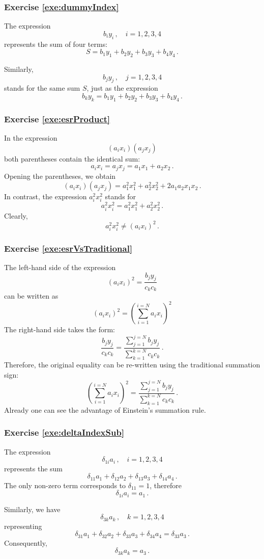 \subsubsection*{Exercise \ref{exe:dummyIndex}}
The expression
\[
b_iy_i\,,\quad i = 1,2,3,4
\]
represents the sum of four terms:
\[
S = b_1y_1 + b_2y_2 + b_3y_3 + b_4y_4\,.
\]

Similarly,
\[
b_jy_j\,,\quad j = 1,2,3,4
\]
stands for the same sum $S$, just as the expression
\[
b_ky_k = b_1y_1 + b_2y_2 + b_3y_3 + b_4y_4\,.
\]

\subsubsection*{Exercise \ref{exe:esrProduct}}
In the expression
\[
(a_ix_i)(a_jx_j)
\]
both parentheses contain the identical sum:
\[
a_ix_i = a_jx_j = a_1x_1 + a_2x_2\,.
\]
Opening the parentheses, we obtain
\[
(a_ix_i)(a_jx_j) = a^2_1x^2_1 + a^2_2x^2_2 + 2a_1a_2x_1x_2\,.
\]
In contrast, the expression $a_i^2x_i^2$ stands for
\[
a_i^2x_i^2 = a^2_1x^2_1 + a^2_2x^2_2\,.
\]
Clearly,
\[
a_i^2x_i^2 \ne (a_ix_i)^2\,.
\]

\subsubsection*{Exercise \ref{exe:esrVsTraditional}}
The left-hand side of the expression
\[
(a_i x_i)^2 = \frac{b_j y_j}{c_k c_k}
\]
can be written as
\[
(a_i x_i)^2 = \left(\sum\limits_{i=1}^{i=N}a_ix_i\right)^2
\]
The right-hand side takes the form:
\[
\frac{b_j y_j}{c_k c_k} = \frac{\sum\limits_{j=1}^{j=N} b_j
  y_j}{\sum\limits_{k=1}^{k=N} c_k c_k}\,.
\]
Therefore, the original equality can be re-written using the
traditional summation sign:
\[
\left(\sum\limits_{i=1}^{i=N}a_ix_i\right)^2 = \frac{\sum\limits_{j=1}^{j=N} b_j
  y_j}{\sum\limits_{k=1}^{k=N} c_k c_k}\,.
\]
Already one can see the advantage of Einstein's summation rule.


\subsubsection*{Exercise \ref{exe:deltaIndexSub}}
The expression
\[
\delta_{1i}a_i\,,\quad i = 1,2,3,4
\]
represents the sum
\[
\delta_{11}a_1 + \delta_{12}a_2 + \delta_{13}a_3 + \delta_{14}a_4\,.
\]
The only non-zero term corresponds to $\delta_{11} = 1$, therefore
\[
\delta_{1i}a_i = a_1\,.
\]

Similarly, we have
\[
\delta_{3k}a_k\,,\quad k = 1,2,3,4
\]
representing
\[
\delta_{31}a_1 + \delta_{32}a_2 + \delta_{33}a_3 + \delta_{34}a_4 = \delta_{33}a_3\,.
\]
Consequently,
\[
\delta_{3k}a_k = a_3\,.
\]

